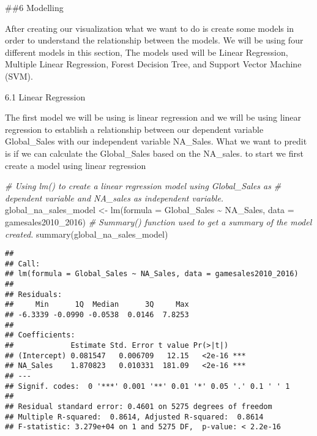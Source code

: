 \documentclass[
]{article}
\newenvironment{Shaded}{\begin{snugshade}}{\end{snugshade}}
\newcommand{\AttributeTok}[1]{\textcolor[rgb]{0.77,0.63,0.00}{#1}}
\newcommand{\CommentTok}[1]{\textcolor[rgb]{0.56,0.35,0.01}{\textit{#1}}}
\newcommand{\FunctionTok}[1]{\textcolor[rgb]{0.00,0.00,0.00}{#1}}
\newcommand{\NormalTok}[1]{#1}
\newcommand{\OtherTok}[1]{\textcolor[rgb]{0.56,0.35,0.01}{#1}}
\newcommand{\SpecialCharTok}[1]{\textcolor[rgb]{0.00,0.00,0.00}{#1}}
\begin{document}
\#\#6 Modelling

After creating our visualization what we want to do is create some
models in order to understand the relationship between the models. We
will be using four different models in this section, The models used
will be Linear Regression, Multiple Linear Regression, Forest Decision
Tree, and Support Vector Machine (SVM).

6.1 Linear Regression

The first model we will be using is linear regression and we will be
using linear regression to establish a relationship between our
dependent variable Global\_Sales with our independent variable
NA\_Sales. What we want to predit is if we can calculate the
Global\_Sales based on the NA\_sales. to start we first create a model
using linear regression

\begin{Shaded}
\begin{Highlighting}[]
\CommentTok{\# Using lm() to create a linear regression model using Global\_Sales as}
\CommentTok{\# dependent variable and NA\_sales as independent variable.}
\NormalTok{global\_na\_sales\_model }\OtherTok{\textless{}{-}} \FunctionTok{lm}\NormalTok{(}\AttributeTok{formula =}\NormalTok{ Global\_Sales }\SpecialCharTok{\textasciitilde{}}\NormalTok{ NA\_Sales, }\AttributeTok{data =}\NormalTok{ gamesales2010\_2016)}
\CommentTok{\# Summary() function used to get a summary of the model created.}
\FunctionTok{summary}\NormalTok{(global\_na\_sales\_model)}
\end{Highlighting}
\end{Shaded}

\begin{verbatim}
## 
## Call:
## lm(formula = Global_Sales ~ NA_Sales, data = gamesales2010_2016)
## 
## Residuals:
##     Min      1Q  Median      3Q     Max 
## -6.3339 -0.0990 -0.0538  0.0146  7.8253 
## 
## Coefficients:
##             Estimate Std. Error t value Pr(>|t|)    
## (Intercept) 0.081547   0.006709   12.15   <2e-16 ***
## NA_Sales    1.870823   0.010331  181.09   <2e-16 ***
## ---
## Signif. codes:  0 '***' 0.001 '**' 0.01 '*' 0.05 '.' 0.1 ' ' 1
## 
## Residual standard error: 0.4601 on 5275 degrees of freedom
## Multiple R-squared:  0.8614, Adjusted R-squared:  0.8614 
## F-statistic: 3.279e+04 on 1 and 5275 DF,  p-value: < 2.2e-16
\end{verbatim}
\end{document}
